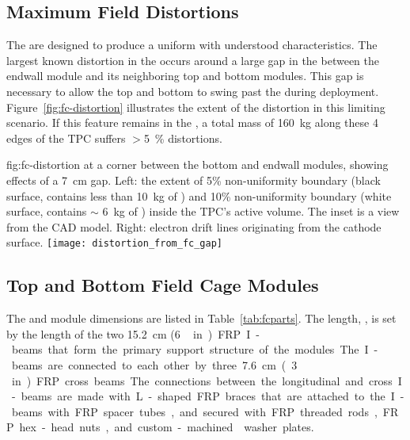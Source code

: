 \subsection{Maximum Field Distortions}

The  are designed to produce a uniform \efield with understood characteristics.
The largest known \efield distortion in the  occurs around a large gap in the  between the endwall module and its neighboring top and bottom modules. This gap is necessary to allow the top and bottom to swing past the  during deployment.  Figure~\ref{fig:fc-distortion} illustrates the extent of the distortion in this limiting scenario. 
If this feature remains in the , a total \lar mass of \SI{160}{kg} along these 4 edges of the TPC suffers $>$\SI{5}{\%} \efield distortions.

\begin{dunefigure}
{fig:fc-distortion}
{\efield at a corner between the bottom and endwall  modules, showing effects of a \SI{7}{cm} gap. Left: the extent of \num{5}\% \efield{} non-uniformity boundary (black surface, contains less than \SI{10}{kg} of \lar) and \num{10}\% non-uniformity boundary (white surface, contains $\sim$ \SI{6}{kg} of \lar) inside the TPC's active volume. The inset is a view from the CAD model.  Right: electron drift lines originating from the cathode surface.}
\texttt{[image: distortion\_from\_fc\_gap]}
\end{dunefigure}



\subsection{Top and Bottom Field Cage Modules}

The  and  module dimensions are listed in Table~\ref{tab:fcparts}. The length, \spfcmodlen{}, is set by the length of the two \SI{15.2}{\cm} (\SI{6}\,in) FRP I-beams that form the primary support structure of the modules. The I-beams are connected to each other by three  \SI{7.6}{\cm} (\SI{3}\,in) FRP cross beams. The connections between the longitudinal and cross I-beams are made with L-shaped FRP braces that are attached to the I-beams with FRP spacer tubes, and secured with FRP threaded rods, FRP hex-head nuts, and custom-machined \frfour washer plates.

